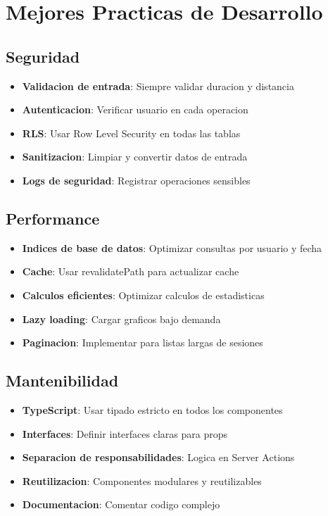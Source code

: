 \documentclass[12pt,a4paper]{article}
\begin{document}
\section{Mejores Practicas de Desarrollo}

\subsection{Seguridad}

\begin{itemize}
    \item \textbf{Validacion de entrada}: Siempre validar duracion y distancia
    \item \textbf{Autenticacion}: Verificar usuario en cada operacion
    \item \textbf{RLS}: Usar Row Level Security en todas las tablas
    \item \textbf{Sanitizacion}: Limpiar y convertir datos de entrada
    \item \textbf{Logs de seguridad}: Registrar operaciones sensibles
\end{itemize}

\subsection{Performance}

\begin{itemize}
    \item \textbf{Indices de base de datos}: Optimizar consultas por usuario y fecha
    \item \textbf{Cache}: Usar revalidatePath para actualizar cache
    \item \textbf{Calculos eficientes}: Optimizar calculos de estadisticas
    \item \textbf{Lazy loading}: Cargar graficos bajo demanda
    \item \textbf{Paginacion}: Implementar para listas largas de sesiones
\end{itemize}

\subsection{Mantenibilidad}

\begin{itemize}
    \item \textbf{TypeScript}: Usar tipado estricto en todos los componentes
    \item \textbf{Interfaces}: Definir interfaces claras para props
    \item \textbf{Separacion de responsabilidades}: Logica en Server Actions
    \item \textbf{Reutilizacion}: Componentes modulares y reutilizables
    \item \textbf{Documentacion}: Comentar codigo complejo
\end{itemize}
\end{document}
